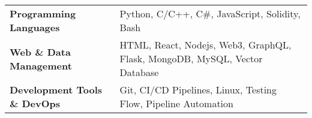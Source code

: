 \begin{tabularx}{\linewidth}{l >{\raggedright\arraybackslash}X}
    \textbf{Programming Languages} & Python, C/C++, C\#, JavaScript, Solidity, Bash \\
    \textbf{Web \& Data Management} & HTML, React, Nodejs, Web3, GraphQL, Flask, MongoDB, MySQL, Vector Database \\
    \textbf{Development Tools \& DevOps} & Git, CI/CD Pipelines, Linux, Testing Flow, Pipeline Automation \\
\end{tabularx}